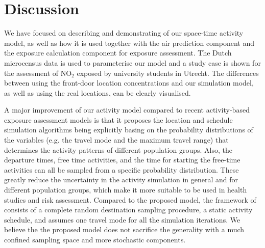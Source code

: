 \documentclass[]{article}
\begin{document}
 

\section{Discussion}
\label{sec:dis}





We have focused on describing and demonstrating of our space-time activity model, as well as how it is used together with the air prediction component and the exposure calculation component for exposure assessment. The Dutch microcensus data is used to parameterise our model and a study case is shown for the assessment of NO$_2$ exposed by university students in Utrecht. The differences between using the front-door location concentrations and our simulation model, as well as using the real locations, can be clearly visualised. 

A major improvement of our activity model compared to recent activity-based exposure assessment models \citep{lu2019activity} is that it proposes the location and schedule simulation algorithms being explicitly basing on the probability distributions of the variables (e.g. the travel mode and the maximum travel range) that determines the activity patterns of different population groups. Also, the departure times, free time activities, and the time for starting the free-time activities can all be sampled from a specific probability distribution. These greatly reduce the uncertainty in the activity simulation in general and for different population groups, which make it more suitable to be used in health studies and risk assessment. Compared to the proposed model, the framework of \citep{lu2019activity} consists of a complete random destination sampling procedure, a static activity schedule, and assumes one travel mode for all the simulation iterations. We believe the the proposed model does not sacrifice the generality with a much confined sampling space and more stochastic components. 


\end{document}
